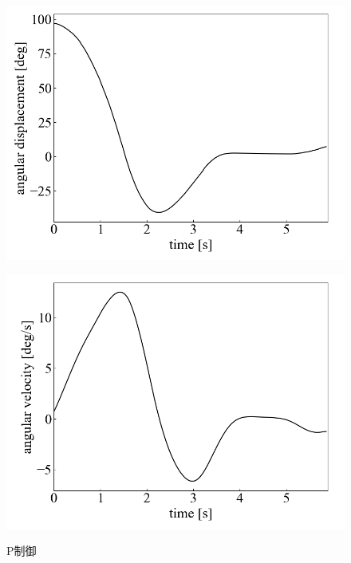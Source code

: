 \begin{figure}[h]
	\centering
	\begin{minipage}{0.43\columnwidth}
	  \centering
	  \includegraphics[width=\columnwidth]{./figure/Pdeg.png}
	  \label{fig:Pdeg}
	\end{minipage}
	\hspace{5mm}
	\begin{minipage}{0.43\columnwidth}
	  \centering
	  \includegraphics[width=\columnwidth]{./figure/Pdegpers.png}
	  \label{fig:Pdegpers}
	\end{minipage}
	\caption{P制御}
	\label{fig:P}
  \end{figure}

